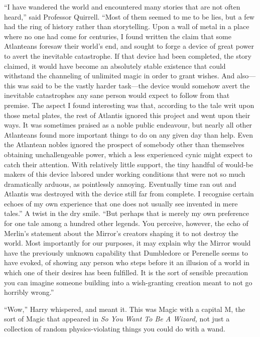 “I have wandered the world and encountered many stories that are not often heard,” said Professor Quirrell. “Most of them seemed to me to be lies, but a few had the ring of history rather than storytelling. Upon a wall of metal in a place where no one had come for centuries, I found written the claim that some Atlanteans foresaw their world’s end, and sought to forge a device of great power to avert the inevitable catastrophe. If that device had been completed, the story claimed, it would have become an absolutely stable existence that could withstand the channeling of unlimited magic in order to grant wishes. And also—this was said to be the vastly harder task—the device would somehow avert the inevitable catastrophes any sane person would expect to follow from that premise. The aspect I found interesting was that, according to the tale writ upon those metal plates, the rest of Atlantis ignored this project and went upon their ways. It was sometimes praised as a noble public endeavour, but nearly all other Atlanteans found more important things to do on any given day than help. Even the Atlantean nobles ignored the prospect of somebody other than themselves obtaining unchallengeable power, which a less experienced cynic might expect to catch their attention. With relatively little support, the tiny handful of would-be makers of this device labored under working conditions that were not so much dramatically arduous, as pointlessly annoying. Eventually time ran out and Atlantis was destroyed with the device still far from complete. I recognise certain echoes of my own experience that one does not usually see invented in mere tales.” A twist in the dry smile. “But perhaps that is merely my own preference for one tale among a hundred other legends. You perceive, however, the echo of Merlin’s statement about the Mirror’s creators shaping it to not destroy the world. Most importantly for our purposes, it may explain why the Mirror would have the previously unknown capability that Dumbledore or Perenelle seems to have evoked, of showing any person who steps before it an illusion of a world in which one of their desires has been fulfilled. It is the sort of sensible precaution you can imagine someone building into a wish-granting creation meant to not go horribly wrong.”

“Wow,” Harry whispered, and meant it. This was Magic with a capital M, the sort of Magic that appeared in \emph{So You Want To Be A Wizard,} not just a collection of random physics-violating things you could do with a wand.

